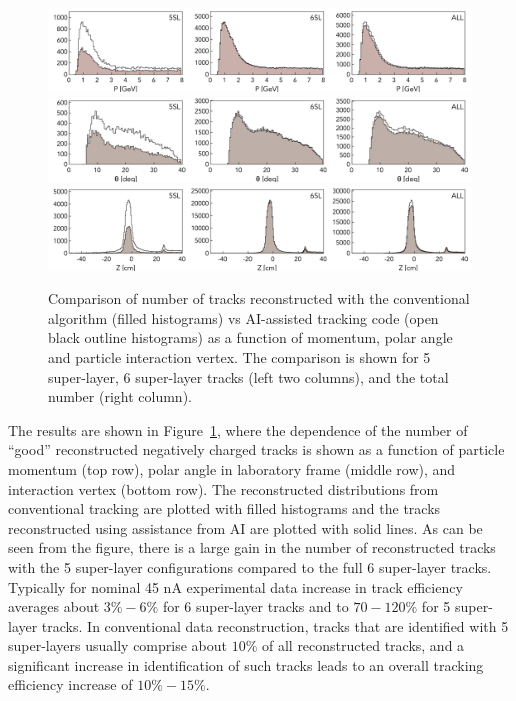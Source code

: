 \documentclass[aps,prl,preprint,12pt]{elsarticle}
\begin{document}
 \begin{figure}[!ht]
\begin{center}
  \includegraphics[width=6.5in]{images/figure_p.pdf}
  \includegraphics[width=6.5in]{images/figure_theta.pdf}
    \includegraphics[width=6.5in]{images/figure_vz.pdf}
\caption { Comparison of number of tracks reconstructed with the conventional 
algorithm (filled histograms) vs AI-assisted tracking code (open black outline 
histograms) as a function of momentum, polar angle and particle interaction vertex. 
The comparison is shown for 5 super-layer, 6 super-layer tracks (left two columns), 
and the total number (right column).}
 \label{track:efficiency}
 \end{center}
\end{figure}

The results are shown in Figure~\ref{track:efficiency}, where the dependence of the number 
of ``good'' reconstructed negatively charged tracks is shown as a function of particle 
momentum (top row), polar angle in laboratory frame (middle row), and interaction vertex 
(bottom row). The reconstructed distributions from conventional tracking are plotted with 
filled histograms and the tracks reconstructed using assistance from AI are plotted with 
solid lines. As can be seen from the figure, there is a large gain in the number of reconstructed 
tracks with the 5 super-layer configurations compared to the full 6 super-layer tracks. Typically 
for nominal 45 nA experimental data increase in track efficiency averages about $3\%-6\%$ 
for 6 super-layer tracks and to $70-120\%$ for 5 super-layer tracks. In conventional data 
reconstruction, tracks that are identified with 5 super-layers usually comprise about $10\%$ 
of all reconstructed tracks, and a significant increase in identification of such tracks leads to 
an overall tracking efficiency increase of $10\%-15\%$. 
 
\end{document}
